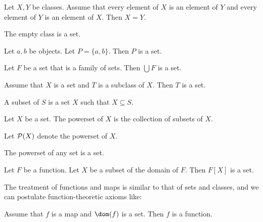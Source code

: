 \documentclass{article}
\newcommand{\pow}{{\cal P}}
\begin{document}
\begin{forthel}
\begin{lemma}[title=Extensionality Axiom]
    Let $X, Y$ be classes.
    Assume that every element of $X$ is an element of $Y$ and every element of
    $Y$ is an element of $X$.
    Then $X = Y$.
\end{lemma}

\begin{axiom}[title=Set Existence Axiom]
The empty class is a set.
\end{axiom}

\begin{axiom}[title=Pairing Axiom]
Let $a,b$ be objects. Let $P = \{a,b\}$. Then $P$  is a set.
\end{axiom}

\begin{axiom}[title=Union Axiom]
Let $F$ be a set that is a family of sets. Then
$\bigcup F$ is a set.
\end{axiom}

\begin{axiom}[title=Separation Axiom]
    Assume that $X$ is a set and $T$ is a subclass of $X$.
    Then $T$ is a set.
\end{axiom}

\begin{definition}
A subset of $S$ is a set $X$ such that $X \subseteq S$.
\end{definition}

\begin{definition}
      Let $X$ be a set.
      The powerset of $X$ is the collection of subsets of $X$.
\end{definition}

Let $\pow(X)$ denote the powerset of $X$.

\begin{axiom}[title=Powerset Axiom]
  The powerset of any set is a set.
\end{axiom}

\begin{axiom}[title=Replacement Axiom]
Let $F$ be a function.
Let $X$ be a subset of the domain of $F$.
Then $F[X]$ is a set.
\end{axiom}
\end{forthel}

The treatment of functions and maps is similar to that
of sets and classes, and we can postulate function-theoretic
axioms like:

\begin{forthel}
  \begin{axiom}
    Assume that $f$ is a map and $\dom(f)$ is a set.
    Then $f$ is a function.
  \end{axiom}
\end{forthel}
\end{document}
